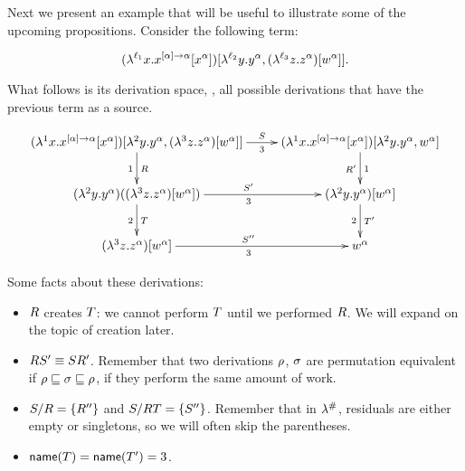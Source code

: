 \bigskip
\begin{example}
Next we present an example that will be useful to illustrate
some of the upcoming propositions. Consider the following term:

\[
  (\lambda^{\ell_1} x. x^{[\alpha] \to \alpha} [x^\alpha])
    [\lambda^{\ell_2} y. y^\alpha,
    (\lambda^{\ell_3} z. z^\alpha) [w^\alpha]].
\]

What follows is its derivation space, \ie,
all possible derivations that have the previous term as a source.

\[
\xymatrix{
  (\lamp{1}{\var}{\var^{[\alpha] \to \alpha} [\var^\alpha])}
    [\lamp{2}{\vartwo}{\vartwo^\alpha},
    (\lamp{3}{\varthree}{\varthree^\alpha}) [w^\alpha]]
    \ar@[->][r]_-{3}^-{\redextwo}
    \ar@[->][d]_{1}^{\redex}
  &
  (\lamp{1}{\var}{\var^{[\alpha] \to \alpha} [\var^\alpha])}
    [\lamp{2}{\vartwo}{\vartwo^\alpha},
    w^\alpha]
   \ar@[->][d]^{1}_{\redex'}
  \\
  (\lamp{2}{\vartwo}{\vartwo^\alpha})
   ((\lamp{3}{\varthree}{\varthree^\alpha}) [w^\alpha])
   \ar@[->][r]_{3}^{\redextwo'}
   \ar@[->][d]_{2}^{\redexthree}
   &
  (\lamp{2}{\vartwo}{\vartwo^\alpha})  [w^\alpha]
  \ar@[->][d]_{2}^{\redexthree'}
   \\
  (\lamp{3}{\varthree}{\varthree^\alpha})  [w^\alpha]
  \ar@[->][r]_{3}^{\redextwo''}
  &
  w^\alpha
  }
\]
\end{example}

Some facts about these derivations:

\begin{itemize}
  \item $R$ creates $T$: we cannot perform $T$ until we performed $R$. We will expand on the topic of creation later.
  \item $R S' \equiv S R'$. Remember that two derivations $\rho$,
    $\sigma$ are permutation equivalent if $\rho \sqsubseteq \sigma \sqsubseteq \rho$,
    \ie if they perform the same amount of work.
  \item $S / R = \{R''\}$ and
    $S / R T = \{S''\}$. Remember that in $\lambda^{\mathtt{\#}}$,
    residuals are either empty or singletons, so we will often skip the parentheses.
  \item $\mathsf{name}(T) = \mathsf{name}(T') = 3$.
\end{itemize}
